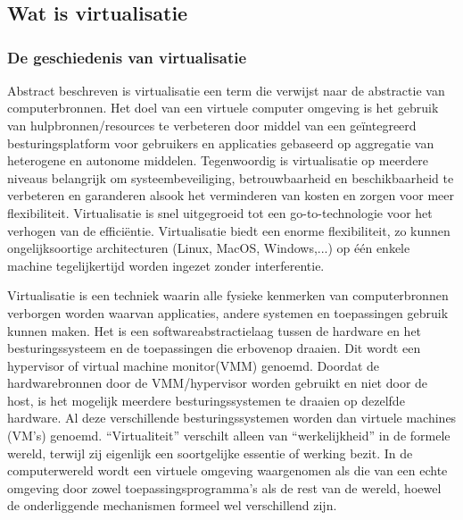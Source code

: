 \chapter{}
\label{ch:stand-van-zaken}

\section{Wat is virtualisatie}
\subsection{De geschiedenis van virtualisatie}

Abstract beschreven is virtualisatie een term die verwijst naar de abstractie van computerbronnen. Het doel van een virtuele computer omgeving is het gebruik van hulpbronnen/resources te verbeteren door middel van een geïntegreerd besturingsplatform voor gebruikers en applicaties gebaseerd op aggregatie van heterogene en autonome middelen. Tegenwoordig is virtualisatie op meerdere niveaus belangrijk om systeembeveiliging, betrouwbaarheid en beschikbaarheid te verbeteren en garanderen alsook het verminderen van kosten en zorgen voor meer flexibiliteit. Virtualisatie is snel uitgegroeid tot een go-to-technologie voor het verhogen van de efficiëntie. Virtualisatie biedt een enorme flexibiliteit, zo kunnen ongelijksoortige architecturen (Linux, MacOS, Windows,...) op één enkele machine tegelijkertijd worden ingezet zonder interferentie. \autocite{Radhwan2013}

Virtualisatie is een techniek waarin alle fysieke kenmerken van computerbronnen verborgen worden waarvan applicaties, andere systemen en toepassingen gebruik kunnen maken. Het is een softwareabstractielaag tussen de hardware en het besturingssysteem en de toepassingen die erbovenop draaien. Dit wordt een hypervisor of virtual machine monitor(VMM) genoemd. Doordat de hardwarebronnen door de VMM/hypervisor worden gebruikt en niet door de host, is het mogelijk meerdere besturingssystemen te draaien op dezelfde hardware. Al deze verschillende besturingssystemen worden dan virtuele machines (VM's) genoemd. “Virtualiteit” verschilt alleen van “werkelijkheid” in de formele wereld, terwijl zij eigenlijk een soortgelijke essentie of werking bezit. In de computerwereld wordt een virtuele omgeving waargenomen als die van een echte omgeving door zowel toepassingsprogramma's als de rest van de wereld, hoewel de onderliggende mechanismen formeel wel verschillend zijn. \autocite{Radhwan2013}


